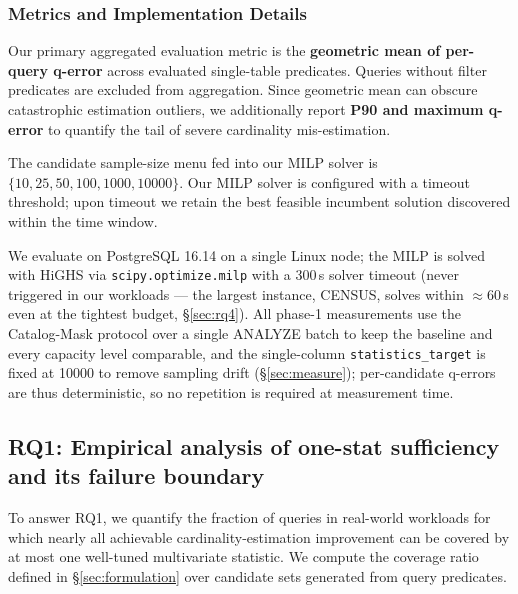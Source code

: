 \documentclass[sigconf, nonacm]{acmart}
\begin{document}
\subsubsection{Metrics and Implementation Details}
Our primary aggregated evaluation metric is the \textbf{geometric mean of per-query q-error} across evaluated single-table predicates.
Queries without filter predicates are excluded from aggregation.
Since geometric mean can obscure catastrophic estimation outliers, we additionally report \textbf{P90 and maximum q-error} to quantify the tail of severe cardinality mis-estimation.

The candidate sample-size menu fed into our MILP solver is $\{10, 25, 50, 100, 1000, 10000\}$.
Our MILP solver is configured with a timeout threshold; upon timeout we retain the best feasible incumbent solution discovered within the time window.

We evaluate on PostgreSQL 16.14 on a single Linux node; the MILP is solved
with HiGHS via \texttt{scipy.optimize.milp} with a 300\,s solver timeout
(never triggered in our workloads --- the largest instance, CENSUS, solves
within $\approx$60\,s even at the tightest budget,
\S\ref{sec:rq4}). All phase-1 measurements use the Catalog-Mask protocol over a
single ANALYZE batch to keep the baseline and every capacity level comparable,
and the single-column \texttt{statistics\_target} is fixed at 10000 to remove
sampling drift (\S\ref{sec:measure}); per-candidate q-errors are thus
deterministic, so no repetition is required at measurement time.

\subsection{RQ1: Empirical analysis of one-stat sufficiency and its failure boundary}
\label{sec:rq1}

To answer RQ1, we quantify the fraction of queries in real-world workloads for which nearly all achievable cardinality-estimation improvement can be covered by at most one well-tuned multivariate statistic.
We compute the coverage ratio defined in \S\ref{sec:formulation} over candidate sets generated from query predicates.
\end{document}
